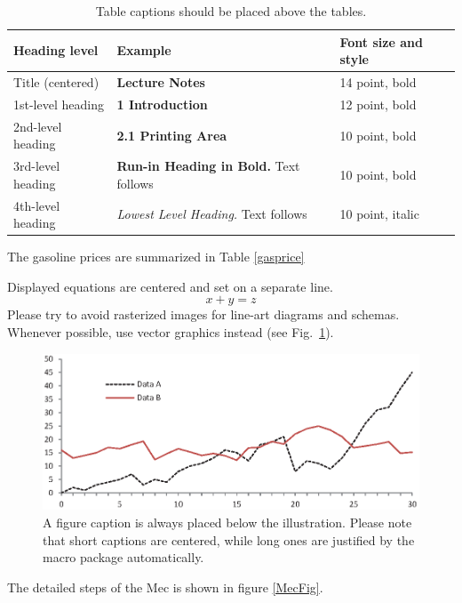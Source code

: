 \documentclass[runningheads]{llncs}
\begin{document}
\begin{table}
\caption{Table captions should be placed above the
tables.}\label{tab1}
\begin{tabular}{|l|l|l|}
\hline
Heading level &  Example & Font size and style\\
\hline
Title (centered) &  {\Large\bfseries Lecture Notes} & 14 point, bold\\
1st-level heading &  {\large\bfseries 1 Introduction} & 12 point, bold\\
2nd-level heading & {\bfseries 2.1 Printing Area} & 10 point, bold\\
3rd-level heading & {\bfseries Run-in Heading in Bold.} Text follows & 10 point, bold\\
4th-level heading & {\itshape Lowest Level Heading.} Text follows & 10 point, italic\\
\hline
\end{tabular}
\end{table}


The gasoline prices are summarized in Table \ref{gasprice}




\noindent Displayed equations are centered and set on a separate
line.
\begin{equation}
x + y = z
\end{equation}
Please try to avoid rasterized images for line-art diagrams and
schemas. Whenever possible, use vector graphics instead (see
Fig.~\ref{fig1}).

\begin{figure}
\includegraphics[width=\textwidth]{fig1.eps}
\caption{A figure caption is always placed below the illustration.
Please note that short captions are centered, while long ones are
justified by the macro package automatically.} 
\label{fig1}
\end{figure}

The detailed steps of the Mec is shown in figure \ref{MecFig}.
\end{document}
